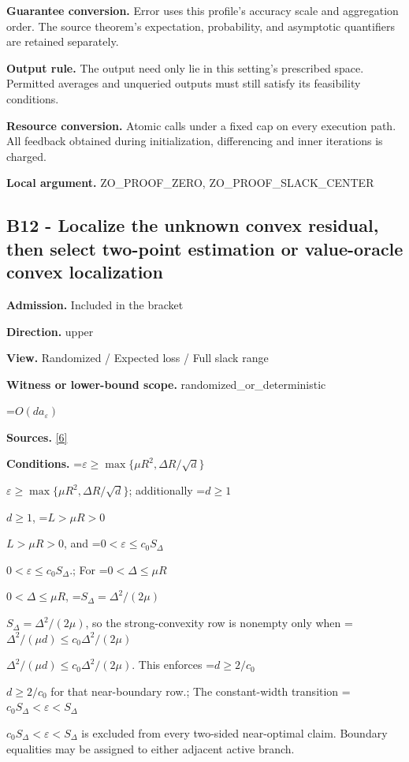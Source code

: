 \documentclass[10pt,a4paper]{article}
\newcommand{\AtlasMath}[1]{\par\begingroup\centering\setbox0=\hbox{$\displaystyle #1$}\ifdim\wd0>1.4\linewidth\typeout{ATLAS WIDE FORMULA: \the\wd0}\fi\ifdim\wd0>\linewidth\resizebox{\linewidth}{!}{\box0}\else\box0\fi\par\endgroup}
\newcommand{\AtlasInlineMath}[1]{\begingroup\setbox0=\hbox{$#1$}\ifdim\wd0>.4\linewidth\endgroup\AtlasMath{#1}\else\endgroup$#1$\fi}
\begin{document}
\textbf{Guarantee conversion.} Error uses this profile's accuracy scale and aggregation order. The source theorem's expectation, probability, and asymptotic quantifiers are retained separately.



\textbf{Output rule.} The output need only lie in this setting's prescribed space. Permitted averages and unqueried outputs must still satisfy its feasibility conditions.



\textbf{Resource conversion.} Atomic calls under a fixed cap on every execution path. All feedback obtained during initialization, differencing and inner iterations is charged.



\textbf{Local argument.} ZO\_PROOF\_ZERO, ZO\_PROOF\_SLACK\_CENTER



\subsection{B12 - Localize the unknown convex residual, then select two-point estimation or value-oracle convex localization}


\textbf{Admission.} Included in the bracket



\textbf{Direction.} upper



\textbf{View.} Randomized / Expected loss / Full slack range



\textbf{Witness or lower-bound scope.} randomized\_or\_deterministic



\AtlasMath{O(da_\varepsilon)}


\textbf{Sources.} \href{https://github.com/WU-Wendao/Colombo/blob/main/colombo_sensorium/Complexity_altas/data/sources/colombo/U10/manuscript.pdf}{[6]}



\textbf{Conditions.} \AtlasInlineMath{\varepsilon\ge\max\{\mu R^2,\Delta R/\sqrt d\}}; additionally \AtlasInlineMath{d\ge1}, \AtlasInlineMath{L>\mu R>0}, and \AtlasInlineMath{0<\varepsilon\le c_0S_\Delta}.; For \AtlasInlineMath{0<\Delta\le\mu R}, \AtlasInlineMath{S_\Delta=\Delta^2/(2\mu)}, so the strong-convexity row is nonempty only when \AtlasInlineMath{\Delta^2/(\mu d)\le c_0\Delta^2/(2\mu)}. This enforces \AtlasInlineMath{d\ge2/c_0} for that near-boundary row.; The constant-width transition \AtlasInlineMath{c_0S_\Delta<\varepsilon<S_\Delta} is excluded from every two-sided near-optimal claim. Boundary equalities may be assigned to either adjacent active branch.
\end{document}

